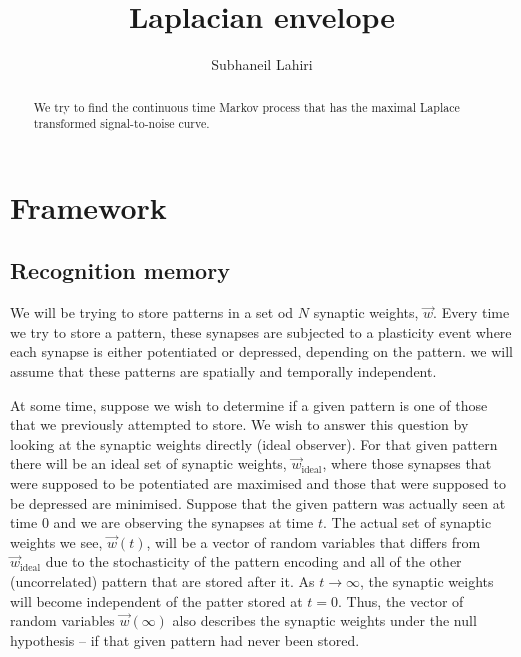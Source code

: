 \documentclass[12pt]{article}
\title{Laplacian envelope}
\author{Subhaneil Lahiri
%
}
\newcommand{\syn}{\vec{w}}
\newcommand{\synid}{\syn_\text{ideal}}
\begin{document}
\maketitle




\begin{abstract}
  We try to find the continuous time Markov process that has the maximal Laplace transformed signal-to-noise curve.
\end{abstract}

\tableofcontents

\listoffigures


\section{Framework}\label{sec:framework}

\subsection{Recognition memory}\label{sec:recog}


We will be trying to store patterns in a set od $N$ synaptic weights, $\syn$.
Every time we try to store a pattern, these synapses are subjected to a plasticity event where each synapse is either potentiated or depressed, depending on the pattern.
we will assume that these patterns are spatially and temporally independent.

At some time, suppose we wish to determine if a given pattern is one of those that we previously attempted to store.
We wish to answer this question by looking at the synaptic weights directly (ideal observer).
For that given pattern there will be an ideal set of synaptic weights, $\synid$, where those synapses that were supposed to be potentiated are maximised and those that were supposed to be depressed are minimised.
Suppose that the given pattern was actually seen at time 0 and we are observing the synapses at time $t$.
The actual set of synaptic weights we see, $\syn(t)$, will be a vector of random variables that differs from $\synid$ due to the stochasticity of the pattern encoding and all of the other (uncorrelated) pattern that are stored after it.
As $t\to\infty$, the synaptic weights will become independent of the patter stored at $t=0$.
Thus, the vector of random variables $\syn(\infty)$ also describes the synaptic weights under the null hypothesis -- if that given pattern had never been stored.
\end{document}
